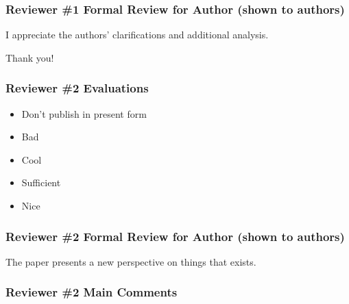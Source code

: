 \documentclass{reviewresponse}
\begin{document}
\subsubsection*{Reviewer \#1 Formal Review for Author (shown to authors)}

{
  \begin{generalcomment}
    I appreciate the authors' clarifications and additional analysis.
  \end{generalcomment}
  \begin{revresponse}[Hi]
    Thank you!
  \end{revresponse}
}

\reviewer

\subsubsection*{Reviewer \#2 Evaluations}

\begin{evaluation}
  \begin{itemize}[leftmargin=4.5cm,noitemsep]
    \item
      [\textbf{Recommendation}] Don't publish in present form
    \item
      [\textbf{Referencing}] Bad
    \item
      [\textbf{Quality}] Cool
    \item
      [\textbf{Data}] Sufficient
    \item
      [\textbf{Accurate Key Points}] Nice
  \end{itemize}
\end{evaluation}

\subsubsection*{Reviewer \#2 Formal Review for Author (shown to authors)}
\begin{generalcomment}
  The paper presents a new perspective on things that exists.
\end{generalcomment}

\subsubsection*{Reviewer \#2 Main Comments}
\end{document}
